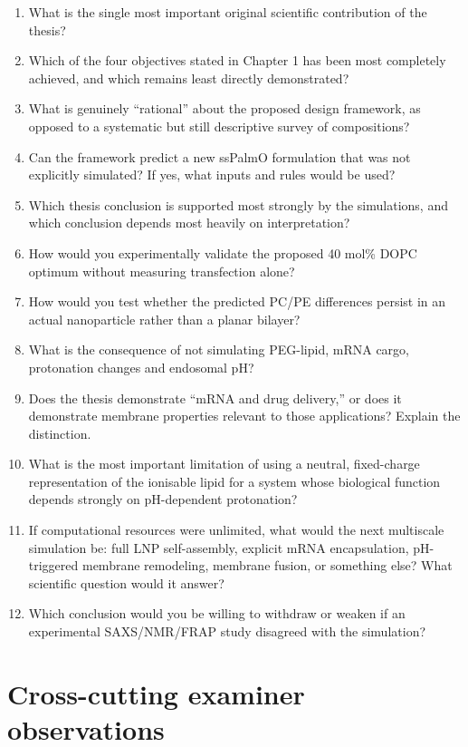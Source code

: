 \documentclass[11pt,a4paper]{article}
\begin{document}
\begin{enumerate}[leftmargin=*]
\item What is the single most important original scientific contribution of the thesis?
\item Which of the four objectives stated in Chapter 1 has been most completely achieved, and which remains least directly demonstrated?
\item What is genuinely ``rational'' about the proposed design framework, as opposed to a systematic but still descriptive survey of compositions?
\item Can the framework predict a new ssPalmO formulation that was not explicitly simulated? If yes, what inputs and rules would be used?
\item Which thesis conclusion is supported most strongly by the simulations, and which conclusion depends most heavily on interpretation?
\item How would you experimentally validate the proposed 40 mol\% DOPC optimum without measuring transfection alone?
\item How would you test whether the predicted PC/PE differences persist in an actual nanoparticle rather than a planar bilayer?
\item What is the consequence of not simulating PEG-lipid, mRNA cargo, protonation changes and endosomal pH?
\item Does the thesis demonstrate ``mRNA and drug delivery,'' or does it demonstrate membrane properties relevant to those applications? Explain the distinction.
\item What is the most important limitation of using a neutral, fixed-charge representation of the ionisable lipid for a system whose biological function depends strongly on pH-dependent protonation?
\item If computational resources were unlimited, what would the next multiscale simulation be: full LNP self-assembly, explicit mRNA encapsulation, pH-triggered membrane remodeling, membrane fusion, or something else? What scientific question would it answer?
\item Which conclusion would you be willing to withdraw or weaken if an experimental SAXS/NMR/FRAP study disagreed with the simulation?
\end{enumerate}

\section*{Cross-cutting examiner observations}
\end{document}
